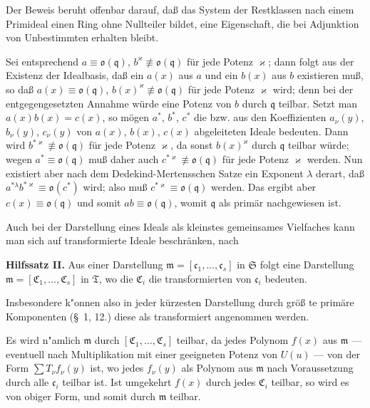 \documentclass[12pt,a4paper]{article}
\begin{document}
{{Der Beweis beruht offenbar darauf, da{\ss} das System der Restklassen nach
einem Primideal einen Ring ohne Nullteiler bildet, eine Eigenschaft, die
bei Adjunktion von Unbestimmten erhalten bleibt.

Sei entsprechend $a\equiv\mathfrak{o}(\mathfrak{q})$, $b^{\varkappa}\not\equiv\mathfrak{o}(\mathfrak{q})$ f\"{u}r jede Potenz $\varkappa$; dann folgt
aus der Existenz der Idealbasis, da{\ss} ein $a(x)$ aus $a$ und ein $b(x)$
aus $b$ existieren mu{\ss}, so da{\ss} $a(x)\equiv\mathfrak{o}(\mathfrak{q})$, $b(x)^{\varkappa}\not\equiv\mathfrak{o}(\mathfrak{q})$ f\"{u}r jede Potenz $\varkappa$
wird; denn bei der entgegengesetzten Annahme w\"{u}rde eine Potenz von $b$
durch $\mathfrak{q}$ teilbar. Setzt man $a(x)b(x)=c(x)$, so m\"{o}gen $a^{*}$, $b^{*}$, $c^{*}$ die bzw.
aus den Koeffizienten $a_{\nu}(y)$, $b_{\nu}(y)$, $c_{\nu}(y)$ von $a(x)$, $b(x)$, $c(x)$ abgeleiteten Ideale
bedeuten. Dann wird $b^{*\varkappa}\not\equiv\mathfrak{o}(\mathfrak{q})$ f\"{u}r jede Potenz $\varkappa$, da sonst $b(x)^{\varkappa}$
durch $\mathfrak{q}$ teilbar w\"{u}rde; wegen $a^{*}\equiv\mathfrak{o}(\mathfrak{q})$ mu{\ss} daher auch $c^{*\varkappa}\not\equiv\mathfrak{o}(\mathfrak{q})$
f\"{u}r jede Potenz $\varkappa$ werden. Nun existiert aber nach dem Dedekind-Mertensschen
Satze ein Exponent $\lambda$ derart, da{\ss} $a^{*\lambda}b^{*\varkappa}\equiv\mathfrak{o}(c^{*})$ wird; also mu{\ss}
$c^{*\varkappa}\equiv\mathfrak{o}(\mathfrak{q})$ werden. Das ergibt aber $c(x)\equiv\mathfrak{o}(\mathfrak{q})$ und somit
$ab\equiv\mathfrak{o}(\mathfrak{q})$, womit $\mathfrak{q}$ als prim\"{a}r nachgewiesen ist.

Auch bei der Darstellung eines Ideals als kleinstes gemeinsames
Vielfaches kann man sich auf transformierte Ideale beschr\"{a}nken, nach

\textbf{Hilfssatz II.} Aus einer Darstellung $\mathfrak{m}=[\mathfrak{c}_{1},\dots,\mathfrak{c}_{s}]$ in $\mathfrak{S}$ folgt
eine Darstellung $\mathfrak{m}=[\mathfrak{C}_{1},\dots,\mathfrak{C}_{s}]$ in $\mathfrak{T}$, wo die $\mathfrak{C}_{i}$ die transformierten
von $\mathfrak{c}_{i}$ bedeuten.

Insbesondere k"{o}nnen also in jeder k\"{u}rzesten Darstellung durch gr\"{o}{\ss} te
prim\"{a}re Komponenten (\S~1, 12.) diese als transformiert angenommen
werden.

Es wird n"{a}mlich $\mathfrak{m}$ durch $[\mathfrak{C}_{1},\dots,\mathfrak{C}_{s}]$ teilbar, da jedes Polynom $f(x)$
aus $\mathfrak{m}$ --- eventuell nach Multiplikation mit einer geeigneten Potenz von
$U(u)$ --- von der Form $\sum T_{\nu}f_{\nu}(y)$ ist, wo jedes $f_{\nu}(y)$ als Polynom aus $\mathfrak{m}$
nach Voraussetzung durch alle $\mathfrak{c}_{i}$ teilbar ist. Ist umgekehrt $f(x)$ durch
jedes $\mathfrak{C}_{i}$ teilbar, so wird es von obiger Form, und somit durch $\mathfrak{m}$ teilbar.

}}
\end{document}
